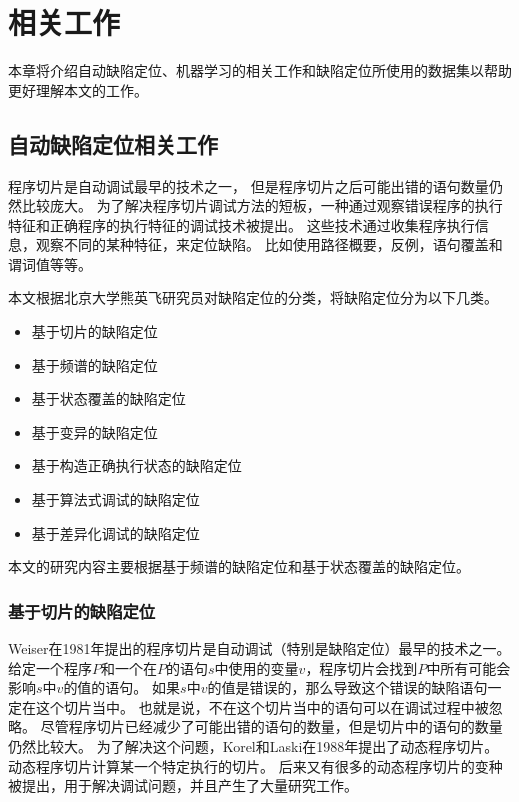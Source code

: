 \chapter{相关工作}

本章将介绍自动缺陷定位、机器学习的相关工作和缺陷定位所使用的数据集以帮助更好理解本文的工作。

\section{自动缺陷定位相关工作}

程序切片\parencite{Weiser1981Program,Weiser1984Program}是自动调试最早的技术之一，
但是程序切片之后可能出错的语句数量仍然比较庞大。
为了解决程序切片调试方法的短板，一种通过观察错误程序的执行特征和正确程序的执行特征的调试技术被提出。
这些技术通过收集程序执行信息，观察不同的某种特征，来定位缺陷。
比如使用路径概要\parencite{Reps1997The}，反例\parencite{Ball2003From,Groce2004Understanding}，语句覆盖\parencite{Jones2002Visualization}和谓词值\parencite{Liblit2005Scalable,Liu2005SOBER}等等。

本文根据北京大学熊英飞研究员对缺陷定位的分类\parencite{YingfeiFL}，将缺陷定位分为以下几类。

\begin{itemize}
\item 基于切片的缺陷定位
\item 基于频谱的缺陷定位
\item 基于状态覆盖的缺陷定位
\item 基于变异的缺陷定位
\item 基于构造正确执行状态的缺陷定位
\item 基于算法式调试的缺陷定位
\item 基于差异化调试的缺陷定位
\end{itemize}

本文的研究内容主要根据基于频谱的缺陷定位和基于状态覆盖的缺陷定位。

\subsection{基于切片的缺陷定位}

Weiser在1981年提出的程序切片\parencite{Weiser1981Program,Weiser1984Program}是自动调试（特别是缺陷定位）最早的技术之一。
给定一个程序$P$和一个在$P$的语句$s$中使用的变量$v$，程序切片会找到$P$中所有可能会影响$s$中$v$的值的语句。
如果$s$中$v$的值是错误的，那么导致这个错误的缺陷语句一定在这个切片当中。
也就是说，不在这个切片当中的语句可以在调试过程中被忽略。
尽管程序切片已经减少了可能出错的语句的数量，但是切片中的语句的数量仍然比较大。
为了解决这个问题，Korel和Laski在1988年提出了动态程序切片\parencite{Korel1988Dynamic}。
动态程序切片计算某一个特定执行的切片。
后来又有很多的动态程序切片的变种被提出\parencite{Demillo1996Critical,Gyim1999An,Zhang2006Pruning,Zhang2003Precise}，用于解决调试问题，并且产生了大量研究工作\parencite{Agrawal1993Debugging,Liu2007Indexing,Al2005The,Alves2011Fault,Ju2014HSFal,Wotawa2010Fault,Mao2014Slice}。

